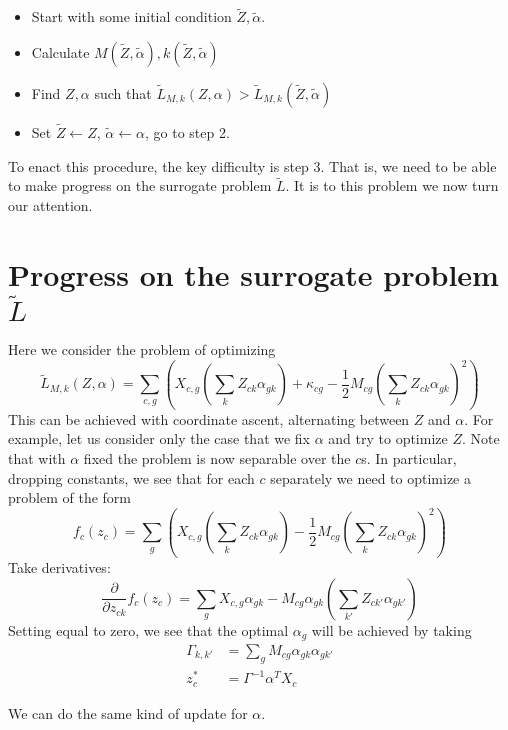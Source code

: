 \documentclass{article}
\begin{document}
\begin{itemize}
    \item Start with some initial condition $\tilde Z,\tilde \alpha$.
    \item Calculate $M(\tilde Z,\tilde \alpha),k(\tilde Z,\tilde \alpha)$
    \item Find $Z,\alpha$ such that $\tilde L_{M,k}(Z,\alpha)>\tilde L_{M,k}(\tilde Z,\tilde \alpha)$
    \item Set $\tilde Z \gets Z$, $\tilde \alpha \gets \alpha$, go to step 2.
\end{itemize}

To enact this procedure, the key difficulty is step 3.  That is, we need to be able to make progress on the surrogate problem $\tilde L$.  It is to this problem we now turn our attention.

\section{Progress on the surrogate problem $\tilde L$}

Here we consider the problem of optimizing 
\[
\tilde L_{M,k}(Z,\alpha) = \sum_{c,g} \left(X_{c,g}\left(\sum_k Z_{ck} \alpha_{gk}\right) + \kappa_{cg} - \frac{1}{2}M_{cg}\left(\sum_k Z_{ck} \alpha_{gk}\right)^2 \right)
\]
This can be achieved with coordinate ascent, alternating between $Z$ and $\alpha$.  For example, let us consider only the case that we fix $\alpha$ and try to optimize $Z$.  Note that with $\alpha$ fixed the problem is now separable over the $c$s.  In particular, dropping constants, we see that for each $c$ separately we need to optimize a problem of the form
\[
f_c(z_c) = \sum_{g} \left(X_{c,g}\left(\sum_k Z_{ck} \alpha_{gk}\right) - \frac{1}{2}M_{cg}\left(\sum_k Z_{ck} \alpha_{gk}\right)^2 \right)
\]
Take derivatives:
\[
\frac{\partial}{\partial z_{ck}}f_c(z_c) = \sum_{g} X_{c,g}\alpha_{gk} - M_{cg}\alpha_{gk}\left(\sum_{k'} Z_{ck'} \alpha_{gk'}\right) 
\]
Setting equal to zero, we see that the optimal $\alpha_g$ will be achieved by taking
\begin{align*}
\Gamma_{k,k'} &= \sum_g M_{cg}\alpha_{gk}\alpha_{gk'}\\
z_c^* &= \Gamma^{-1} \alpha^T X_c
\end{align*}

We can do the same kind of update for $\alpha$.
\end{document}
